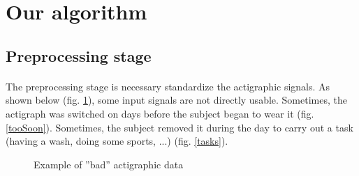 \documentclass[a4paper,12pt]{article}
\begin{document}

\newpage

\section{Our algorithm}
\label{method}
\subsection{Preprocessing stage}
\paragraph{}
The preprocessing stage is necessary standardize the actigraphic signals. As shown below (fig. \ref{preprocessing}), some input signals are not directly usable. Sometimes, the actigraph was switched on days before the subject began to wear it (fig. \ref{tooSoon}). Sometimes, the subject removed it during the day to carry out a task (having a wash, doing some sports, ...) (fig. \ref{tasks}).

\begin{figure}[H]
\centering
{}
\caption{Example of ''bad'' actigraphic data}
\label{preprocessing}
\end{figure}
\end{document}

